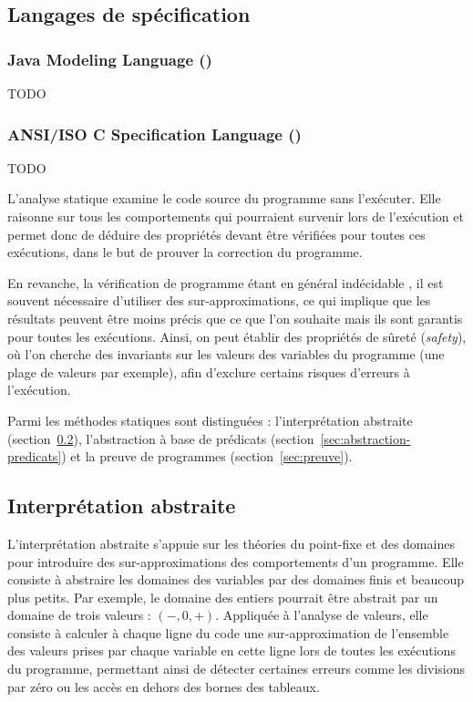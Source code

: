 \subsection{Langages de spécification}
\label{sec:speclang}


\subsubsection*{Java Modeling Language (\jml)}
\label{sec:jml}

TODO


\subsubsection*{ANSI/ISO C Specification Language (\acsl)}
\label{sec:acsl}

TODO

L'analyse statique \cite{Nielson/99} examine le code source du programme
sans l'exécuter. Elle raisonne sur tous les comportements qui pourraient
survenir lors de l'exécution et permet donc de déduire des propriétés devant
être vérifiées pour toutes ces exécutions, dans le but de prouver la correction
du programme.

En revanche, la vérification de programme étant en général indécidable
\cite{Landi/92}, il est souvent nécessaire d'utiliser des
sur-approximations, ce qui implique que les résultats peuvent être moins précis
que ce que l'on souhaite mais ils sont garantis pour toutes les exécutions.
Ainsi, on peut établir des propriétés de sûreté ({\em safety}), où l’on cherche
des invariants sur les valeurs des variables du programme (une plage de valeurs
par exemple), afin d'exclure certains risques d'erreurs à l'exécution.

Parmi les méthodes statiques sont distinguées : l'interprétation abstraite
(section~\ref{sec:interpretation-abstraite}), l'abstraction à base de
prédicats (section~\ref{sec:abstraction-predicats}) et la preuve de programmes
(section~\ref{sec:preuve}).


\subsection{Interprétation abstraite}
\label{sec:interpretation-abstraite}

L'interprétation abstraite \cite{Cousot/92} s'appuie sur les
théories du point-fixe et des domaines pour introduire des sur-approximations
des comportements d'un programme. Elle consiste à abstraire les domaines des
variables par des domaines finis et beaucoup plus petits. Par exemple, le
domaine des entiers pourrait être abstrait par un domaine de trois valeurs :
$(-, 0, +)$. Appliquée à l’analyse de valeurs, elle consiste à calculer à
chaque ligne du code une sur-approximation de l’ensemble des valeurs prises par
chaque variable en cette ligne lors de toutes les exécutions du programme,
permettant ainsi de détecter certaines erreurs comme les divisions par zéro ou
les accès en dehors des bornes des tableaux.


